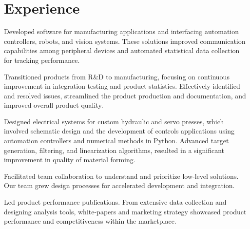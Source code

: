 \documentclass{TaylorTurnerResume2023}
\begin{document}

\begin{minipage}[t]{0.7\textwidth} 

\section{Experience}
\vspace{\topsep}
\begin{tightemize}
\sectionsep
\item Developed software for manufacturing applications and interfacing automation controllers, robots, and vision systems. These solutions improved communication capabilities among peripheral devices and automated statistical data collection for tracking performance.
\item Transitioned products from R\&D to manufacturing, focusing on continuous improvement in integration testing and product statistics. Effectively identified and resolved issues, streamlined the product production and documentation, and improved overall product quality. 
\end{tightemize}
\sectionsep

\begin{tightemize}
\sectionsep
\item Designed electrical systems for custom hydraulic and servo presses, which involved schematic design and the development of controls applications using automation controllers and numerical methods in Python. Advanced target generation, filtering, and linearization algorithms, resulted in a significant improvement in quality of material forming.
\item Facilitated team collaboration to understand and prioritize low-level solutions. Our team grew design processes for accelerated development and integration. 
\item Led product performance publications. From extensive data collection and designing analysis tools, white-papers and marketing strategy showcased product performance and competitiveness within the marketplace. 
\end{tightemize}
\sectionsep


\end{minipage}
\end{document}
